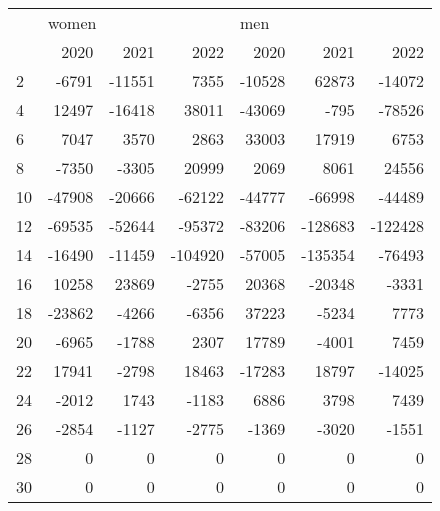 \begin{tabular}{lrrrrrr}
\toprule
{} & \multicolumn{3}{l}{women} & \multicolumn{3}{l}{men} \\
{} &   2020 &   2021 &    2022 &   2020 &    2021 &    2022 \\
\midrule
2  &  -6791 & -11551 &    7355 & -10528 &   62873 &  -14072 \\
4  &  12497 & -16418 &   38011 & -43069 &    -795 &  -78526 \\
6  &   7047 &   3570 &    2863 &  33003 &   17919 &    6753 \\
8  &  -7350 &  -3305 &   20999 &   2069 &    8061 &   24556 \\
10 & -47908 & -20666 &  -62122 & -44777 &  -66998 &  -44489 \\
12 & -69535 & -52644 &  -95372 & -83206 & -128683 & -122428 \\
14 & -16490 & -11459 & -104920 & -57005 & -135354 &  -76493 \\
16 &  10258 &  23869 &   -2755 &  20368 &  -20348 &   -3331 \\
18 & -23862 &  -4266 &   -6356 &  37223 &   -5234 &    7773 \\
20 &  -6965 &  -1788 &    2307 &  17789 &   -4001 &    7459 \\
22 &  17941 &  -2798 &   18463 & -17283 &   18797 &  -14025 \\
24 &  -2012 &   1743 &   -1183 &   6886 &    3798 &    7439 \\
26 &  -2854 &  -1127 &   -2775 &  -1369 &   -3020 &   -1551 \\
28 &      0 &      0 &       0 &      0 &       0 &       0 \\
30 &      0 &      0 &       0 &      0 &       0 &       0 \\
\bottomrule
\end{tabular}
